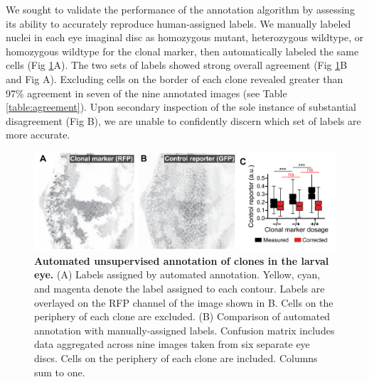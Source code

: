 \documentclass[10pt,letterpaper]{article}
\begin{document}
We sought to validate the performance of the annotation algorithm by assessing its ability to accurately reproduce human-assigned labels. We manually labeled nuclei in each eye imaginal disc as homozygous mutant, heterozygous wildtype, or homozygous wildtype for the clonal marker, then automatically labeled the same cells (Fig \ref{fig3}A). The two sets of labels showed strong overall agreement (Fig \ref{fig3}B and Fig A). Excluding cells on the border of each clone revealed greater than 97\% agreement in seven of the nine annotated images (see Table \ref{table:agreement}). Upon secondary inspection of the sole instance of substantial disagreement (Fig B), we are unable to confidently discern which set of labels are more accurate.

\begin{figure}[t]
\centering
\includegraphics[scale=1.0]{./figure_3}
\caption{\textbf{Automated unsupervised annotation of clones in the larval eye.} (A) Labels assigned by automated annotation. Yellow, cyan, and magenta denote the label assigned to each contour. Labels are overlayed on the RFP channel of the image shown in B. Cells on the periphery of each clone are excluded. (B) Comparison of automated annotation with manually-assigned labels. Confusion matrix includes data aggregated across nine images taken from six separate eye discs. Cells on the periphery of each clone are included. Columns sum to one.}
\label{fig3}
\end{figure}
\end{document}
